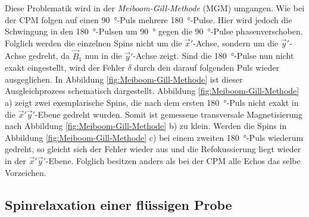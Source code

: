 Diese Problematik wird in der \emph{Meiboom-Gill-Methode} (MGM)
umgangen.
Wie bei der CPM folgen auf einen \SI{90}{\degree}-Puls mehrere \SI{180}{\degree}-Pulse.
Hier wird jedoch die Schwingung in den \SI{180}{\degree}-Pulsen
um \SI{90}{\degree} gegen die \SI{90}{\degree}-Pulse phasenverschoben.
Folglich werden die einzelnen Spins nicht um die $\vec{x}'$-Achse,
sondern um die $\vec{y}'$-Achse gedreht, da $\vec{B}_1$ nun in die $\vec{y}'$-Achse zeigt.
Sind die \SI{180}{\degree}-Pulse nun nicht exakt eingestellt,
wird der Fehler $\delta$ durch den darauf folgenden Puls wieder ausgeglichen.
In Abbildung \ref{fig:Meiboom-Gill-Methode} ist dieser Ausgleichprozess schematisch
dargestellt.
Abbildung \ref{fig:Meiboom-Gill-Methode} a) zeigt zwei exemplarische Spins,
die nach dem ersten \SI{180}{\degree}-Puls
nicht exakt in die $\vec{x}' \vec{y}'$-Ebene gedreht wurden.
Somit ist gemessene transversale Magnetisierung
nach Abbildung \ref{fig:Meiboom-Gill-Methode} b) zu klein.
Werden die Spins in Abbildung \ref{fig:Meiboom-Gill-Methode} c) bei einem zweiten
\SI{180}{\degree}-Puls wiederum gedreht, so gleicht sich der Fehler
wieder aus und die Refokussierung liegt wieder in der $\vec{x}' \vec{y}'$-Ebene.
Folglich besitzen anders als bei der CPM alle Echos das selbe Vorzeichen.


\subsection{Spinrelaxation einer flüssigen Probe}
\label{sec:DiffusionTheo}

